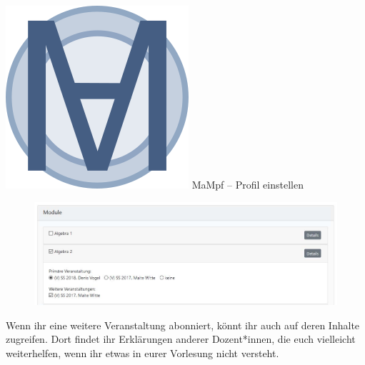 \begin{frame}{\includegraphics[scale=0.072]{images/mampf.png} MaMpf -- Profil einstellen}
{        \begin{figure}
            \centering
            \includegraphics[scale=0.3]{images/mampf25.jpg}
        \end{figure}
        Wenn ihr eine weitere Veranstaltung abonniert, könnt ihr auch auf deren
        Inhalte zugreifen.
        Dort findet ihr Erklärungen anderer Dozent*innen, die euch vielleicht
        weiterhelfen, wenn ihr etwas in eurer Vorlesung nicht versteht.
    }
\end{frame}

